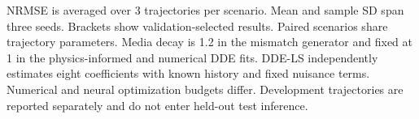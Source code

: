 \begin{table}[t]
\begin{tabular*}{\textwidth}{@{\extracolsep{\fill}}lccc@{}}
\bottomrule
\end{tabular*}
\par\smallskip
\begin{minipage}{\textwidth}\footnotesize NRMSE is averaged over 3 trajectories per scenario. Mean and sample SD span three seeds. Brackets show validation-selected results. Paired scenarios share trajectory parameters. Media decay is 1.2 in the mismatch generator and fixed at 1 in the physics-informed and numerical DDE fits. DDE-LS independently estimates eight coefficients with known history and fixed nuisance terms. Numerical and neural optimization budgets differ. Development trajectories are reported separately and do not enter held-out test inference.\end{minipage}
\end{table}
